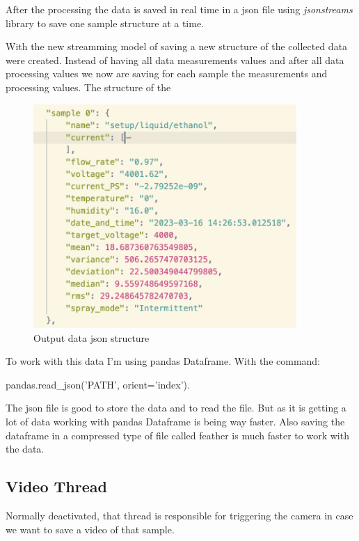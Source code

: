         After the processing the data is saved in real time in a json file using \emph{jsonstreams} library to save one sample structure at a time.

        With the new streamming model of saving a new structure of the collected data were created.
        Instead of having all data measurements values and after all data processing values we now are saving for each sample the measurements and processing values.
        The structure of the 
    
        \begin{figure}[H]
            \center
            \includegraphics[width=10cm]{Figuras/19:03/new_sample.png}
            \caption{Output data json structure}
        \end{figure}
    
        To work with this data I'm using pandas Dataframe.
        With the command:
        
        pandas.read\_json('PATH', orient='index').
    
        The json file is good to store the data and to read the file. But as it is getting a lot of data working with pandas Dataframe is being way faster. Also saving the dataframe in a compressed
        type of file called feather is much faster to work with the data.
    
    \subsection{Video Thread}

        Normally deactivated, that thread is responsible for triggering the camera in case we want to save a video of that sample.
    
